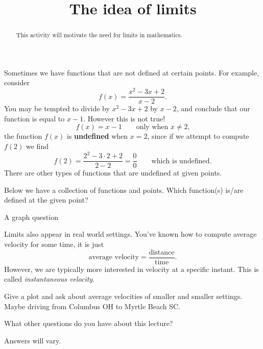\documentclass{ximera}
\title{The idea of limits}
\begin{document}
\begin{abstract}
  This activity will motivate the need for limits in mathematics.
\end{abstract}
\maketitle

Sometimes we have functions that are not defined at certain
points. For example, consider
\[
f(x) = \frac{x^2 - 3x + 2}{x-2}.
\]
You may be tempted to divide by $x^2 - 3x + 2$ by $x-2$, and conclude
that our function is equal to $x-1$. However this is not true!
\[
f(x) = x-1 \qquad\text{only when $x\ne 2$,}
\]
the function $f(x)$ is \textbf{undefined} when $x= 2$, since if we
attempt to compute $f(2)$ we find
\[
f(2) = \frac{2^2-3\cdot 2+2}{2-2} = \frac{0}{0}\qquad\text{which is  undefined}.
\]
There are other types of functions that are undefined at given points. 

\begin{question}
  Below we have a collection of functions and points. Which
  function(s) is/are defined at the given point?
\begin{solution}
\begin{multiple-choice}
\end{multiple-choice}
\end{solution}
\end{question}


\begin{question}
A graph question
\end{question}




Limits also appear in real world settings. You've known how to compute
average velocity for some time, it is just
\[
\text{average velocity} = \frac{\text{distance}}{\text{time}}.
\]
However, we are typically more interested in velocity at a specific
instant. This is called \textit{instantaneous velocity}.

\begin{question}
  Give a plot and ask about average velocities of smaller and smaller
  settings. Maybe driving from Columbus OH to Myrtle Beach SC. 

  \begin{solution}
    \begin{multiple-choice}
    \end{multiple-choice}  
  \end{solution}
\end{question}

What other questions do you have about this lecture?
\begin{free-response}
Answers will vary.
\end{free-response}
\end{document}
